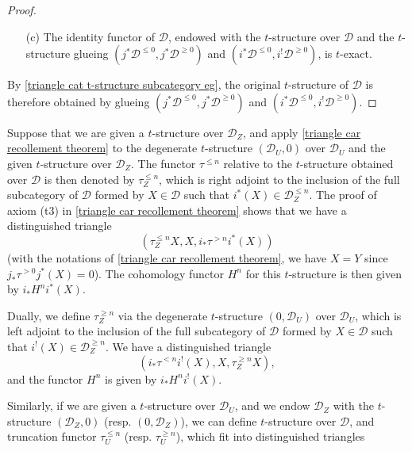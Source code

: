 \begin{proof}
\begin{enumerate}
    \item[(c)] The identity functor of $\mathcal{D}$, endowed with the $t$-structure over $\mathcal{D}$ and the $t$-structure glueing $(j^*\mathcal{D}^{\leq 0},j^*\mathcal{D}^{\geq 0})$ and $(i^*\mathcal{D}^{\leq 0},i^!\mathcal{D}^{\geq 0})$, is $t$-exact.
\end{enumerate}
By \cref{triangle cat t-structure subcategory eg}, the original $t$-structure of $\mathcal{D}$ is therefore obtained by glueing $(j^*\mathcal{D}^{\leq 0},j^*\mathcal{D}^{\geq 0})$ and $(i^*\mathcal{D}^{\leq 0},i^!\mathcal{D}^{\geq 0})$.
\end{proof}

Suppose that we are given a $t$-structure over $\mathcal{D}_Z$, and apply \cref{triangle car recollement theorem} to the degenerate $t$-structure $(\mathcal{D}_U,0)$ over $\mathcal{D}_U$ and the given $t$-structure over $\mathcal{D}_Z$. The functor $\tau^{\leq n}$ relative to the $t$-structure obtained over $\mathcal{D}$ is then denoted by $\tau^{\leq n}_Z$, which is right adjoint to the inclusion of the full subcategory of $\mathcal{D}$ formed by $X\in\mathcal{D}$ such that $i^*(X)\in\mathcal{D}_Z^{\leq n}$. The proof of axiom (t3) in \cref{triangle car recollement theorem} shows that we have a distinguished triangle
\begin{equation}\label{triangle car recollement truncation tau_Z^leq dt}
(\tau^{\leq n}_ZX,X,i_*\tau^{>n}i^*(X))
\end{equation}
(with the notations of \cref{triangle car recollement theorem}, we have $X=Y$ since $j_*\tau^{>0}j^*(X)=0$). The cohomology functor $H^n$ for this $t$-structure is then given by $i_*H^ni^*(X)$.\par
Dually, we define $\tau^{\geq n}_Z$ via the degenerate $t$-structure $(0,\mathcal{D}_U)$ over $\mathcal{D}_U$, which is left adjoint to the inclusion of the full subcategory of $\mathcal{D}$ formed by $X\in\mathcal{D}$ such that $i^!(X)\in\mathcal{D}_Z^{\geq n}$. We have a distinguished triangle
\begin{equation}\label{triangle car recollement truncation tau_Z^geq dt}
(i_*\tau^{<n}i^!(X),X,\tau^{\geq n}_ZX),
\end{equation}
and the functor $H^n$ is given by $i_*H^ni^!(X)$.\par
Similarly, if we are given a $t$-structure over $\mathcal{D}_U$, and we endow $\mathcal{D}_Z$ with the $t$-structure $(\mathcal{D}_Z,0)$ (resp. $(0,\mathcal{D}_Z)$), we can define $t$-structure over $\mathcal{D}$, and truncation functor $\tau^{\leq n}_U$ (resp. $\tau^{\geq n}_U$), which fit into distinguished triangles
